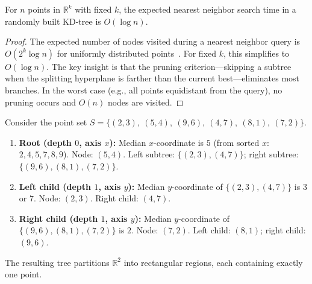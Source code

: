 \begin{theorem}
\label{thm:kd_nn_complexity}
For $n$ points in $\mathbb{R}^k$ with fixed $k$, the expected nearest neighbor search time in a randomly built KD-tree is $O(\log n)$.
\end{theorem}
\begin{proof}
The expected number of nodes visited during a nearest neighbor query is $O(2^k \log n)$ for uniformly distributed points~\cite{friedman1977}. For fixed $k$, this simplifies to $O(\log n)$. The key insight is that the pruning criterion---skipping a subtree when the splitting hyperplane is farther than the current best---eliminates most branches. In the worst case (e.g., all points equidistant from the query), no pruning occurs and $O(n)$ nodes are visited.
\end{proof}

\begin{example}
\label{ex:kd_build}
Consider the point set $S = \{(2,3),\ (5,4),\ (9,6),\ (4,7),\ (8,1),\ (7,2)\}$.
\begin{enumerate}
    \item \textbf{Root (depth $0$, axis $x$):} Median $x$-coordinate is $5$ (from sorted $x$: $2,4,5,7,8,9$).  Node: $(5,4)$.  Left subtree: $\{(2,3),(4,7)\}$; right subtree: $\{(9,6),(8,1),(7,2)\}$.
    \item \textbf{Left child (depth $1$, axis $y$):} Median $y$-coordinate of $\{(2,3),(4,7)\}$ is $3$ or $7$.  Node: $(2,3)$.  Right child: $(4,7)$.
    \item \textbf{Right child (depth $1$, axis $y$):} Median $y$-coordinate of $\{(9,6),(8,1),(7,2)\}$ is $2$.  Node: $(7,2)$.  Left child: $(8,1)$; right child: $(9,6)$.
\end{enumerate}
The resulting tree partitions $\mathbb{R}^2$ into rectangular regions, each containing exactly one point.
\end{example}



